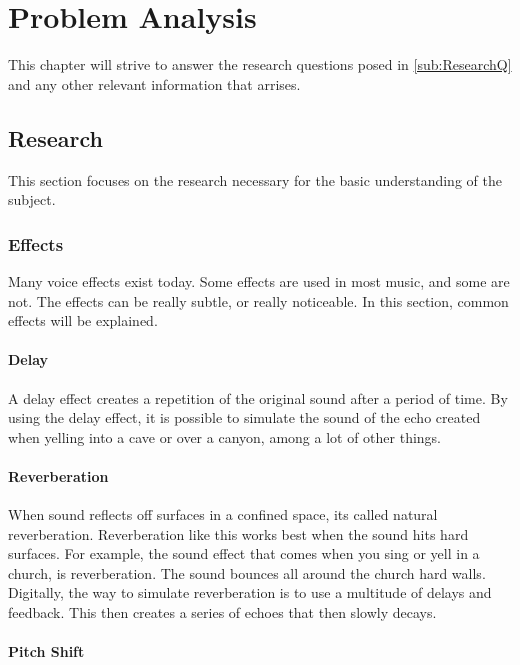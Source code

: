 \chapter{Problem Analysis}
This chapter will strive to answer the research questions posed in \ref{sub:ResearchQ} and any other relevant information that arrises. 


\section{Research}
This section focuses on the research necessary for the basic understanding of the subject.  
\subsection{Effects}
Many voice effects exist today. Some effects are used in most music, and some are not. The effects can be really subtle, or really noticeable.
In this section, common effects will be explained.


\subsubsection{Delay}

A delay effect creates a repetition of the original sound after a period of time\citep{Loeffler_2014}. By using the delay effect, it is possible to simulate the sound of the echo created when yelling into a cave or over a canyon, among a lot of other things.

\subsubsection{Reverberation}

When sound reflects off surfaces in a confined space, its called natural reverberation\citep{Redmon_1997}. Reverberation like this works best when the sound hits hard surfaces. For example, the sound effect that comes when you sing or yell in a church, is reverberation. The sound bounces all around the church hard walls.
Digitally, the way to simulate reverberation is to use a multitude of delays and feedback. This then creates a series of echoes that then slowly decays.

\subsubsection{Pitch Shift}

